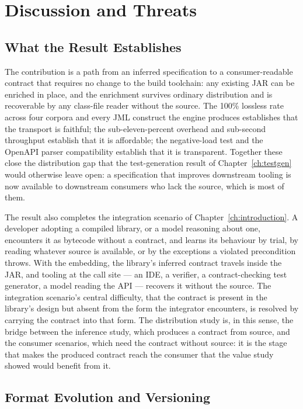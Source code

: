 \section{Discussion and Threats}
\label{sec:dist-discussion}

\subsection{What the Result Establishes}

The contribution is a path from an inferred specification to a consumer-readable
contract that requires no change to the build toolchain: any existing JAR can be
enriched in place, and the enrichment survives ordinary distribution and is
recoverable by any class-file reader without the source. The 100\% lossless rate
across four corpora and every JML construct the engine produces establishes that
the transport is faithful; the sub-eleven-percent overhead and sub-second
throughput establish that it is affordable; the negative-load test and the
OpenAPI parser compatibility establish that it is transparent. Together these
close the distribution gap that the test-generation result of
Chapter~\ref{ch:testgen} would otherwise leave open: a specification that
improves downstream tooling is now available to downstream consumers who lack
the source, which is most of them.

The result also completes the integration scenario of
Chapter~\ref{ch:introduction}. A developer adopting a compiled library, or a model
reasoning about one, encounters it as bytecode without a contract, and learns its
behaviour by trial, by reading whatever source is available, or by the exceptions a
violated precondition throws. With the embedding, the library's inferred contract
travels inside the JAR, and tooling at the call site --- an IDE, a verifier, a
contract-checking test generator, a model reading the API --- recovers it without
the source. The integration scenario's central difficulty, that the contract is
present in the library's design but absent from the form the integrator encounters,
is resolved by carrying the contract into that form. The distribution study is, in
this sense, the bridge between the inference study, which produces a contract from
source, and the consumer scenarios, which need the contract without source: it is
the stage that makes the produced contract reach the consumer that the value study
showed would benefit from it.

\subsection{Format Evolution and Versioning}

